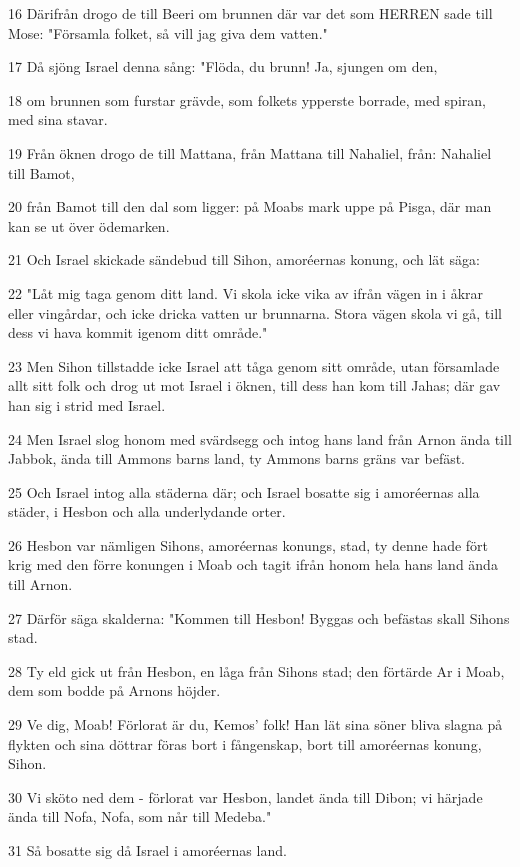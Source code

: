 \par 16 Därifrån drogo de till Beeri om brunnen där var det som HERREN sade till Mose: "Församla folket, så vill jag giva dem vatten."
\par 17 Då sjöng Israel denna sång: "Flöda, du brunn! Ja, sjungen om den,
\par 18 om brunnen som furstar grävde, som folkets ypperste borrade, med spiran, med sina stavar.
\par 19 Från öknen drogo de till Mattana, från Mattana till Nahaliel, från: Nahaliel till Bamot,
\par 20 från Bamot till den dal som ligger: på Moabs mark uppe på Pisga, där man kan se ut över ödemarken.
\par 21 Och Israel skickade sändebud till Sihon, amoréernas konung, och lät säga:
\par 22 "Låt mig taga genom ditt land. Vi skola icke vika av ifrån vägen in i åkrar eller vingårdar, och icke dricka vatten ur brunnarna. Stora vägen skola vi gå, till dess vi hava kommit igenom ditt område."
\par 23 Men Sihon tillstadde icke Israel att tåga genom sitt område, utan församlade allt sitt folk och drog ut mot Israel i öknen, till dess han kom till Jahas; där gav han sig i strid med Israel.
\par 24 Men Israel slog honom med svärdsegg och intog hans land från Arnon ända till Jabbok, ända till Ammons barns land, ty Ammons barns gräns var befäst.
\par 25 Och Israel intog alla städerna där; och Israel bosatte sig i amoréernas alla städer, i Hesbon och alla underlydande orter.
\par 26 Hesbon var nämligen Sihons, amoréernas konungs, stad, ty denne hade fört krig med den förre konungen i Moab och tagit ifrån honom hela hans land ända till Arnon.
\par 27 Därför säga skalderna: "Kommen till Hesbon! Byggas och befästas skall Sihons stad.
\par 28 Ty eld gick ut från Hesbon, en låga från Sihons stad; den förtärde Ar i Moab, dem som bodde på Arnons höjder.
\par 29 Ve dig, Moab! Förlorat är du, Kemos' folk! Han lät sina söner bliva slagna på flykten och sina döttrar föras bort i fångenskap, bort till amoréernas konung, Sihon.
\par 30 Vi sköto ned dem - förlorat var Hesbon, landet ända till Dibon; vi härjade ända till Nofa, Nofa, som når till Medeba."
\par 31 Så bosatte sig då Israel i amoréernas land.
